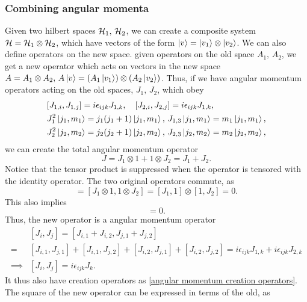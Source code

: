 \subsubsection*{Combining angular momenta}
Given two hilbert spaces $\mathcal H_1, \, \mathcal H_2$, we can create a composite system $\mathcal H= \mathcal H_1 \otimes \mathcal H_2$, which have vectors of the form $\ket v = \ket{v_1} \otimes \ket{v_2}$. We can also define operators on the new space. given operators on the old space $A_1, \, A_2$, we get a new operator which acts on vectors in the new space $A = A_1 \otimes A_2, \, A \ket v = (A_1 \ket{v_1})\otimes (A_2 \ket{v_2})$. Thus, if we have angular momentum operators acting on the old spaces, $J_1, \, J_2$,  which obey
\begin{align*}
    &[J_{1,i}, J_{1, j}] = i \epsilon_{ijk}J_{1, k}, \quad [J_{2, i}, J_{2, j}] = i \epsilon_{ijk}J_{1, k}, \\
    &J_1^2 \ket{j_1, m_1} = j_1(j_1+1)\ket{j_1, m_1}, \, J_{1, 3} \ket{j_1, m_1} = m_1\ket{j_1, m_1}, \\
    &J_2^2 \ket{j_2, m_2} = j_2(j_2+1)\ket{j_2, m_2}, \, J_{2, 3} \ket{j_2, m_2} = m_2\ket{j_2, m_2}, 
\end{align*}
we can create the total angular momentum operator
\begin{equation*}
    J = J_1 \otimes 1 + 1 \otimes J_2 = J_1 + J_2.
\end{equation*}
Notice that the tensor product is suppressed when the operator is tensored with the identity operator. The two original operators commute, as
\begin{equation*}
    [J_1, J_2] = [J_1\otimes1, 1\otimes J_2] = [J_1, 1]\otimes[1, J_2] = 0.
\end{equation*}
This also implies
\begin{equation*}
    [J_1^2, J_2^2] = 0.
\end{equation*}Thus, the new operator is a angular momentum operator
\begin{align}
    &[J_i, J_j] = [J_{i, 1} + J_{i, 2}, J_{j, 1} + J_{j, 2}] \nonumber \\ 
    =&[J_{i, 1}, J_{j, 1}] + [J_{i, 1}, J_{j, 2}]  + [J_{i, 2}, J_{j, 1}]  + [J_{i, 2}, J_{j, 2}] =  i \epsilon_{ijk}J_{1, k} + i \epsilon_{ijk}J_{2, k} \nonumber \\
    \implies & [J_i, J_j] = i \epsilon_{ijk} J_k.
\end{align}
It thus also have creation operators as \eqref{angular momentum creation operators}. The square of the new operator can be expressed in terms of the old, as

